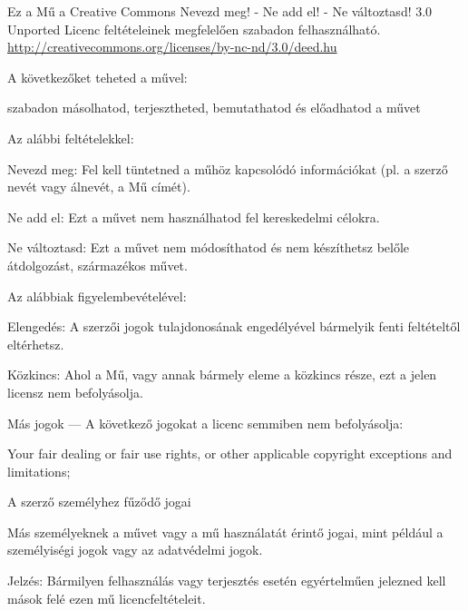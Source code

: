 
{\smaller\setlength{\parindent}{0pt}%
\raggedright\label{copyright-details}
{\centering

{\large\ccbyncnd}
\bigskip

Ez a Mű a Creative Commons Nevezd meg! - Ne add el! - Ne változtasd! 3.0 Unported Licenc feltételeinek megfelelően szabadon felhasználható.\\
\href{http://creativecommons.org/licenses/by-nc-nd/3.0/deed.hu}{http://creativecommons.org/licenses/by-nc-nd/3.0/deed.hu}\\

}
\bigskip

A következőket teheted a művel:
\vspace*{-\baselineskip}

\begin{packeditemize}
\item szabadon másolhatod, terjesztheted, bemutathatod és előadhatod a művet
\end{packeditemize}

Az alábbi feltételekkel:
\vspace*{-\baselineskip}

\begin{packeditemize}
\item Nevezd meg: Fel kell tüntetned a műhöz kapcsolódó információkat (pl. a szerző nevét vagy álnevét, a Mű címét).
\item Ne add el: Ezt a művet nem használhatod fel kereskedelmi célokra.
\item Ne változtasd: Ezt a művet nem módosíthatod és nem készíthetsz belőle átdolgozást, származékos művet.
\end{packeditemize}

Az alábbiak figyelembevételével:
\vspace*{-\baselineskip}

\begin{packeditemize}
\item Elengedés: A szerzői jogok tulajdonosának engedélyével bármelyik fenti feltételtől eltérhetsz.
\item Közkincs: Ahol a Mű, vagy annak bármely eleme a közkincs része, ezt a jelen licensz nem befolyásolja.
\item Más jogok — A következő jogokat a licenc semmiben nem befolyásolja:
\begin{packeditemize}
\item Your fair dealing or fair use rights, or other applicable copyright exceptions and limitations;
\item A szerző személyhez fűződő jogai
\item Más személyeknek a művet vagy a mű használatát érintő jogai, mint például a személyiségi jogok vagy az adatvédelmi jogok.
\end{packeditemize}
\item Jelzés: Bármilyen felhasználás vagy terjesztés esetén egyértelműen jelezned kell mások felé ezen mű licencfeltételeit.
\end{packeditemize}

}
